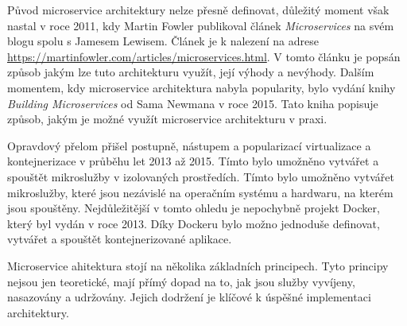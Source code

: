 Původ microservice architektury nelze přesně definovat, důležitý moment však nastal v roce 2011, kdy Martin Fowler publikoval článek \textit{Microservices} na svém blogu spolu s Jamesem Lewisem. Článek je k nalezení na adrese \url{https://martinfowler.com/articles/microservices.html}. V tomto článku je popsán způsob jakým lze tuto architekturu využít, její výhody a nevýhody. Dalším momentem, kdy microservice architektura nabyla popularity, bylo vydání knihy \textit{Building Microservices} od Sama Newmana v roce 2015. Tato kniha popisuje způsob, jakým je možné využít microservice architekturu v praxi.

Opravdový přelom přišel postupně, nástupem a popularizací virtualizace a kontejnerizace v průběhu let 2013 až 2015. Tímto bylo umožněno vytvářet a spouštět mikroslužby v izolovaných prostředích. Tímto bylo umožněno vytvářet mikroslužby, které jsou nezávislé na operačním systému a hardwaru, na kterém jsou spouštěny. Nejdůležitější v tomto ohledu je nepochybně projekt Docker, který byl vydán v roce 2013. \cite{dockerdocs} Díky Dockeru bylo možno jednoduše definovat, vytvářet a spouštět kontejnerizované aplikace. 


Microservice ahitektura stojí na několika základních principech. Tyto principy nejsou jen teoretické, mají přímý dopad na to, jak jsou služby vyvíjeny, nasazovány a udržovány. Jejich dodržení je klíčové k úspěšné implementaci architektury. \cite{Richardson2018}

